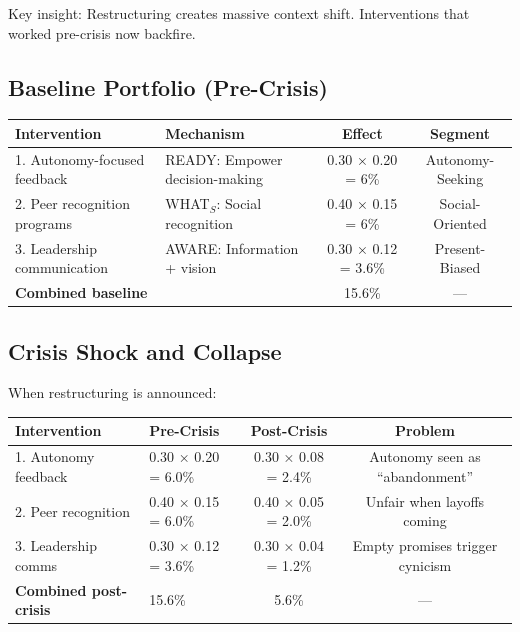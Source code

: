 Key insight: Restructuring creates massive context shift. Interventions that worked pre-crisis now backfire.

\subsection{Baseline Portfolio (Pre-Crisis)}

\begin{center}
\begin{tabular}{@{}llcc@{}}
\toprule
\textbf{Intervention} & \textbf{Mechanism} & \textbf{Effect} & \textbf{Segment} \\
\midrule
1. Autonomy-focused feedback & READY: Empower decision-making & 0.30 × 0.20 = 6\% & Autonomy-Seeking \\
2. Peer recognition programs & WHAT$_S$: Social recognition & 0.40 × 0.15 = 6\% & Social-Oriented \\
3. Leadership communication & AWARE: Information + vision & 0.30 × 0.12 = 3.6\% & Present-Biased \\
\midrule
\textbf{Combined baseline} & & 15.6\% & --- \\
\midrule
\end{tabular}
\end{center}

\subsection{Crisis Shock and Collapse}

When restructuring is announced:

\begin{center}
\begin{tabular}{@{}llcc@{}}
\toprule
\textbf{Intervention} & \textbf{Pre-Crisis} & \textbf{Post-Crisis} & \textbf{Problem} \\
\midrule
1. Autonomy feedback & 0.30 × 0.20 = 6.0\% & 0.30 × 0.08 = 2.4\% & Autonomy seen as ``abandonment'' \\
2. Peer recognition & 0.40 × 0.15 = 6.0\% & 0.40 × 0.05 = 2.0\% & Unfair when layoffs coming \\
3. Leadership comms & 0.30 × 0.12 = 3.6\% & 0.30 × 0.04 = 1.2\% & Empty promises trigger cynicism \\
\midrule
\textbf{Combined post-crisis} & 15.6\% & 5.6\% & --- \\
\midrule
\end{tabular}
\end{center}

